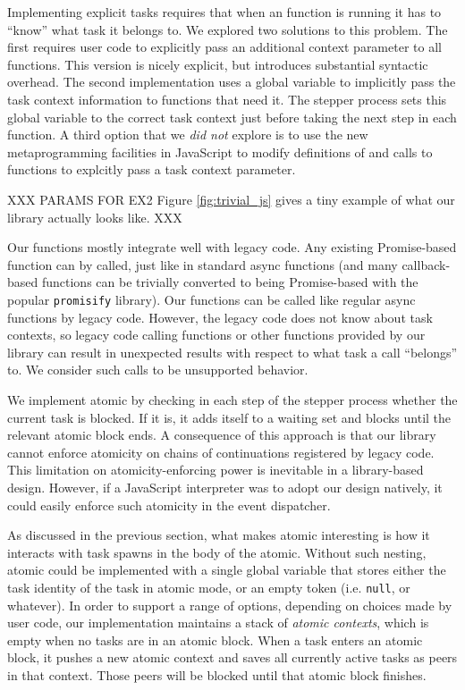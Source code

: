 \documentclass[acmsmall,anonymous,review]{acmart}\settopmatter{printfolios=true,printccs=false,printacmref=false}
\begin{document}
Implementing explicit tasks requires that when an \asyncs{} function is running it has to ``know'' what task it belongs to.
We explored two solutions to this problem.
The first requires user code to explicitly pass an additional context parameter to all \asyncs{} functions.
This version is nicely explicit, but introduces substantial syntactic overhead.
The second implementation uses a global variable to implicitly pass the task context information to functions that need it.
The stepper process sets this global variable to the correct task context just before taking the next step in each \asyncs{} function.
A third option that we \emph{did not} explore is to use the new metaprogramming facilities in JavaScript to modify definitions of and calls to \asyncs{} functions to explcitly pass a task context parameter.

XXX PARAMS FOR EX2
Figure \ref{fig:trivial_js} gives a tiny example of what our library actually looks like.
XXX

Our \asyncs{} functions mostly integrate well with legacy code.
Any existing Promise-based function can by called, just like in standard async functions (and many callback-based functions can be trivially converted to being Promise-based with the popular \texttt{promisify} library).
Our \asyncs{} functions can be called like regular async functions by legacy code.
However, the legacy code does not know about task contexts, so legacy code calling \asyncs{} functions or other functions provided by our library can result in unexpected results with respect to what task a call ``belongs'' to.
We consider such calls to be unsupported behavior.

We implement atomic by checking in each step of the stepper process whether the current task is blocked.
If it is, it adds itself to a waiting set and blocks until the relevant atomic block ends.
A consequence of this approach is that our library cannot enforce atomicity on chains of continuations registered by legacy code.
This limitation on atomicity-enforcing power is inevitable in a library-based design.
However, if a JavaScript interpreter was to adopt our design natively, it could easily enforce such atomicity in the event dispatcher.

As discussed in the previous section, what makes atomic interesting is how it interacts with task spawns in the body of the atomic.
Without such nesting, atomic could be implemented with a single global variable that stores either the task identity of the task in atomic mode, or an empty token (i.e. \texttt{null}, or whatever).
In order to support a range of options, depending on choices made by user code, our implementation maintains a stack of \emph{atomic contexts}, which is empty when no tasks are in an atomic block.
When a task enters an atomic block, it pushes a new atomic context and saves all currently active tasks as peers in that context.
Those peers will be blocked until that atomic block finishes.
\end{document}
